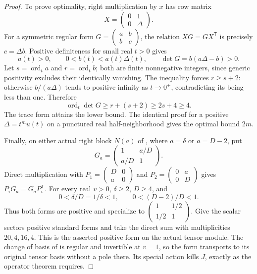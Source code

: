 \begin{proof}
To prove optimality, right multiplication by $x$ has row matrix
\[
 X=\begin{pmatrix}0&1\\0&\Delta\end{pmatrix}.
\]
For a symmetric regular form
$G=\left(\begin{smallmatrix}a&b\\b&c\end{smallmatrix}\right)$,
the relation $XG=GX^{\mathsf T}$ is precisely $c=\Delta b$.
Positive definiteness for small real $t>0$ gives
\[
 a(t)>0,\qquad 0<b(t)<a(t)\Delta(t),\qquad
 \det G=b(a\Delta-b)>0.
\]
Let $s=\operatorname{ord}_t a$ and $r=\operatorname{ord}_t b$;
both are finite nonnegative integers, since generic positivity
excludes their identically vanishing. The inequality forces
$r\ge s+2$: otherwise $b/(a\Delta)$ tends to positive infinity
as $t\to0^+$, contradicting its being less than one. Therefore
\[
 \operatorname{ord}_t\det G
 \ge r+(s+2)\ge2s+4\ge4.
\]
The trace form attains the lower bound. The identical proof for a
positive $\Delta=t^m u(t)$ on a punctured real half-neighborhood
gives the optimal bound $2m$.

Finally, on either actual right block $N(a)$ of , where
$a=\delta$ or $a=D-2$, put
\[
 G_a=\begin{pmatrix}1&a/D\\a/D&1\end{pmatrix}.
\]
Direct multiplication with
$P_1=\left(\begin{smallmatrix}D&0\\a&0\end{smallmatrix}\right)$
and $P_2=\left(\begin{smallmatrix}0&a\\0&D\end{smallmatrix}\right)$
gives $P_iG_a=G_aP_i^{\mathsf T}$. For every real $v>0$,
$\delta\ge2$, $D\ge4$, and
\[
 0<\delta/D=1/\delta<1,\qquad 0<(D-2)/D<1.
\]
Thus both forms are positive and specialize to
$\left(\begin{smallmatrix}1&1/2\\1/2&1\end{smallmatrix}\right)$.
Give the scalar sectors positive standard forms and take the
direct sum with multiplicities $20,4,16,4$. This is the asserted
positive form on the actual tensor module. The change of basis
of  is regular and invertible at $v=1$, so the form
transports to its original tensor basis without a pole there.
Its special action kills $J$, exactly as the operator theorem requires.
\end{proof}

